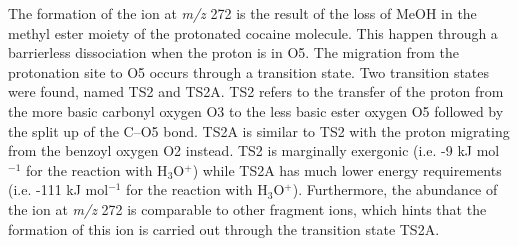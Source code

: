 The formation of the ion at \textit{m/z} 272 is the result of the loss of MeOH in the methyl ester moiety of the protonated cocaine molecule.
%
This happen through a barrierless dissociation when the proton is in O5. 
%
The migration from the protonation site to O5 occurs through a transition state.
%
Two transition states were found, named TS2 and TS2A.
%
TS2 refers to the transfer of the proton from the more basic carbonyl oxygen O3 to the less basic ester oxygen O5 followed by the split up of the C--O5 bond.
%
TS2A is similar to TS2 with the proton migrating from the benzoyl oxygen O2 instead. %
%
TS2 is marginally exergonic (i.e. -9 kJ mol$^{-1}$ for the reaction with H$_3$O$^+$) while TS2A has much lower energy requirements (i.e. -111 kJ mol$^{-1}$ for the reaction with H$_3$O$^+$).
%
Furthermore, the abundance of the ion at \textit{m/z} 272 is comparable to other fragment ions, which hints that the formation of this ion is carried out through the transition state TS2A.


